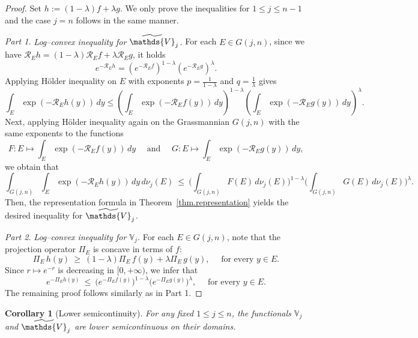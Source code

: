 \documentclass[11pt]{article}
\newtheorem{corollary}[theorem]{Corollary}
\theoremstyle{definition}
\numberwithin{equation}{section}
\newcommand{\Gr}[2]{G(#1,#2)}        %
\newcommand{\opV}{\mathds{V}}       %
\begin{document}
\begin{proof}
Set $h := (1-\lambda)f+\lambda g$. 
We only prove the inequalities for $1 \leq j \leq n - 1$ and the case $j = n$ follows in the same manner.

\smallskip

\textit{Part 1.} \emph{Log--convex inequality for $\widetilde\opV_j$.} 
For each $E \in \Gr{j}{n}$, since we have $\mathscr R_E h=(1-\lambda)\mathscr R_E f+\lambda\mathscr R_E g$, it holds
\[
e^{-\mathscr R_E h}=(e^{-\mathscr R_E f})^{1-\lambda}(e^{-\mathscr R_E g})^\lambda.
\]
Applying Hölder inequality on $E$ with exponents $p=\frac{1}{1-\lambda}$ and $q=\frac{1}{\lambda}$ gives
\[
\int_E \exp(-\mathscr R_E h(y)) \, dy \le \left(\int_E \exp(-\mathscr R_E f(y)) \, dy \right)^{1-\lambda}
\left(\int_E \exp(-\mathscr R_E g(y)) \, dy \right)^{\lambda}.
\]
Next, applying Hölder inequality again on the Grassmannian $\Gr{j}{n}$ with the same exponents to the functions
\[
    F: E \mapsto \int_E \exp(-\mathscr R_E f(y)) \, dy 
    \quad \text{ and } \quad
    G: E \mapsto \int_E \exp(-\mathscr R_E g(y)) \, dy,
\]
we obtain that
\[
\int_{G(j,n)}\!\int_E \exp(-\mathscr R_E h(y))\, dy \, d\nu_j(E)\ \le\
\Big(\int_{G(j,n)} F(E) \, d\nu_j(E)\Big)^{1-\lambda}
\Big(\int_{G(j,n)} G(E) \, d\nu_j(E)\Big)^{\lambda}.
\]
Then, the representation formula in Theorem~\ref{thm.representation} yields the desired inequality for $\widetilde \opV_j$.

\medskip

\textit{Part 2.} \emph{Log--convex inequality for $\opV_j$.} For each $E \in G(j, n)$, note that the projection operator $\Pi_E$ is concave in terms of $f$:
\[
\Pi_E \, h(y)\ \ge\ (1-\lambda)\Pi_E \, f(y) + \lambda\Pi_E \,  g(y), \quad \text{ for every } y \in E.
\]
Since $r\mapsto e^{-r}$ is decreasing in $[0, + \infty)$, we infer that
\[
e^{-\Pi_E h(y)}\ \le\ \big( e^{-\Pi_E f(y)} \big)^{1-\lambda} \big(e^{-\Pi_E g(y)} \big)^\lambda, \quad \text{ for every } y \in E.
\]
The remaining proof follows similarly as in Part 1.
\end{proof}

\begin{corollary}[Lower semicontinuity]\label{cor.lsc}
    For any fixed $1 \leq j \leq n$, the functionals $\opV_j$ and $\widetilde \opV_j$ are lower semicontinuous on their domains.
\end{corollary}
\end{document}
